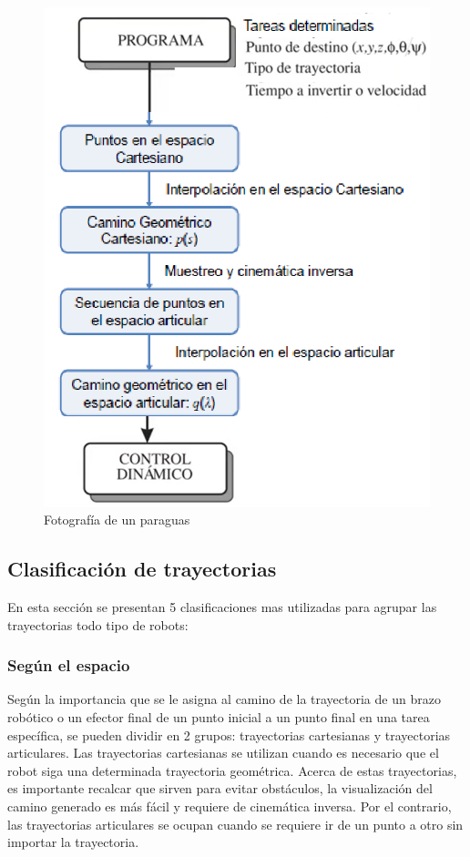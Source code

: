    \begin{figure}[htb]
        \centering
        \includegraphics[width=0.65\linewidth]{Main/Chapter4/Images4/cap4_tray_3.png}
        \caption{Fotografía de un paraguas}
        \label{f:Cap4_tray_3}
    \end{figure}  
    
    

        \newpage

    \subsection{Clasificación de trayectorias}
        En esta sección se presentan 5 clasificaciones mas utilizadas para agrupar las trayectorias todo tipo de robots:
        
        \subsubsection{Según el espacio }
            Según la importancia que se le asigna al camino de la trayectoria de un brazo robótico o un efector final de un punto inicial a un punto final en una tarea específica, se pueden dividir en 2 grupos: trayectorias cartesianas y trayectorias articulares. Las trayectorias cartesianas se utilizan cuando es necesario que el robot siga una determinada trayectoria geométrica. Acerca de estas trayectorias, es importante recalcar que sirven para evitar obstáculos, la visualización del camino generado es más fácil y requiere de cinemática inversa. Por el contrario, las trayectorias articulares se ocupan cuando se requiere ir de un punto a otro sin importar la trayectoria. 
            
